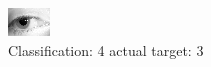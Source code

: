\begin{figure}[h!]
\begin{center}
\includegraphics[width=0.60\columnwidth]{figures/ID1378_class_4_target_3.png}
\end{center}
\caption{ Classification: 4 actual target: 3}
\label{fig:ID1378_class_4_target_3}
\end{figure}
